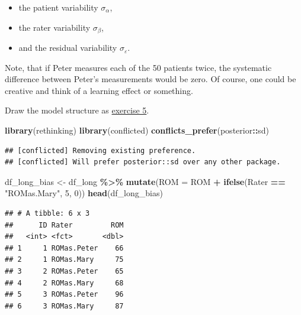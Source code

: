 \documentclass[
]{book}
\newenvironment{Shaded}{\begin{snugshade}}{\end{snugshade}}
\newcommand{\AttributeTok}[1]{\textcolor[rgb]{0.13,0.29,0.53}{#1}}
\newcommand{\DecValTok}[1]{\textcolor[rgb]{0.00,0.00,0.81}{#1}}
\newcommand{\FunctionTok}[1]{\textcolor[rgb]{0.13,0.29,0.53}{\textbf{#1}}}
\newcommand{\NormalTok}[1]{#1}
\newcommand{\OtherTok}[1]{\textcolor[rgb]{0.56,0.35,0.01}{#1}}
\newcommand{\SpecialCharTok}[1]{\textcolor[rgb]{0.81,0.36,0.00}{\textbf{#1}}}
\newcommand{\StringTok}[1]{\textcolor[rgb]{0.31,0.60,0.02}{#1}}
\providecommand{\tightlist}{%
  \setlength{\itemsep}{0pt}\setlength{\parskip}{0pt}}
\begin{document}
\begin{itemize}
\tightlist
\item
  the patient variability \(\sigma_{\alpha}\),
\item
  the rater variability \(\sigma_{\beta}\),
\item
  and the residual variability \(\sigma_{\varepsilon}\).
\end{itemize}

Note, that if Peter measures each of the 50 patients twice,
the systematic difference between Peter's measurements would
be zero. Of course, one could be creative and think of
a learning effect or something.

Draw the model structure as \hyperref[exercise5]{exercise 5}.

\begin{Shaded}
\begin{Highlighting}[]
\FunctionTok{library}\NormalTok{(rethinking)}
\FunctionTok{library}\NormalTok{(conflicted)}
\FunctionTok{conflicts\_prefer}\NormalTok{(posterior}\SpecialCharTok{::}\NormalTok{sd)}
\end{Highlighting}
\end{Shaded}

\begin{verbatim}
## [conflicted] Removing existing preference.
## [conflicted] Will prefer posterior::sd over any other package.
\end{verbatim}

\begin{Shaded}
\begin{Highlighting}[]
\NormalTok{df\_long\_bias }\OtherTok{\textless{}{-}}\NormalTok{ df\_long }\SpecialCharTok{\%\textgreater{}\%}
  \FunctionTok{mutate}\NormalTok{(}\AttributeTok{ROM =}\NormalTok{ ROM }\SpecialCharTok{+} \FunctionTok{ifelse}\NormalTok{(Rater }\SpecialCharTok{==} \StringTok{"ROMas.Mary"}\NormalTok{, }\DecValTok{5}\NormalTok{, }\DecValTok{0}\NormalTok{))}
\FunctionTok{head}\NormalTok{(df\_long\_bias)}
\end{Highlighting}
\end{Shaded}

\begin{verbatim}
## # A tibble: 6 x 3
##      ID Rater         ROM
##   <int> <fct>       <dbl>
## 1     1 ROMas.Peter    66
## 2     1 ROMas.Mary     75
## 3     2 ROMas.Peter    65
## 4     2 ROMas.Mary     68
## 5     3 ROMas.Peter    96
## 6     3 ROMas.Mary     87
\end{verbatim}
\end{document}
